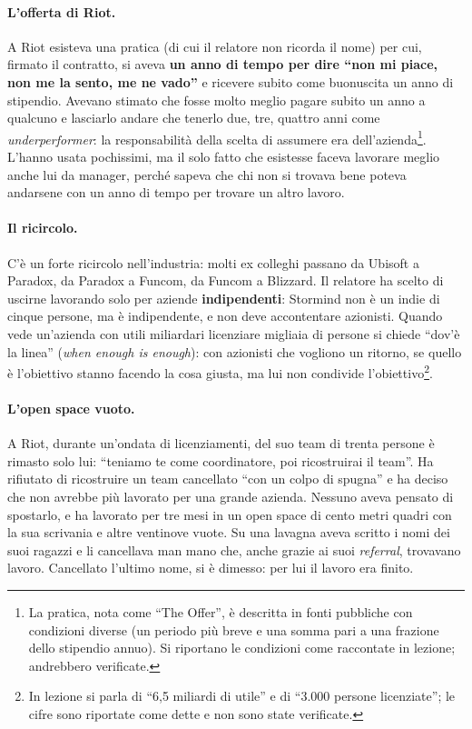 \paragraph{L'offerta di Riot.} A Riot esisteva una pratica (di cui il relatore
non ricorda il nome) per cui, firmato il contratto, si aveva \textbf{un anno
di tempo per dire ``non mi piace, non me la sento, me ne vado''} e ricevere
subito come buonuscita un anno di stipendio. Avevano stimato che fosse molto
meglio pagare subito un anno a qualcuno e lasciarlo andare che tenerlo due,
tre, quattro anni come \emph{underperformer}: la responsabilità della scelta
di assumere era dell'azienda\footnote{La pratica, nota come ``The Offer'', è
descritta in fonti pubbliche con condizioni diverse (un periodo più breve e
una somma pari a una frazione dello stipendio annuo). Si riportano le
condizioni come raccontate in lezione; andrebbero verificate.}. L'hanno usata
pochissimi, ma il solo fatto che esistesse faceva lavorare meglio anche lui da
manager, perché sapeva che chi non si trovava bene poteva andarsene con un
anno di tempo per trovare un altro lavoro.

\paragraph{Il ricircolo.} C'è un forte ricircolo nell'industria: molti ex
colleghi passano da Ubisoft a Paradox, da Paradox a Funcom, da Funcom a
Blizzard. Il relatore ha scelto di uscirne lavorando solo per aziende
\textbf{indipendenti}: Stormind non è un indie di cinque persone, ma è
indipendente, e non deve accontentare azionisti. Quando vede un'azienda con
utili miliardari licenziare migliaia di persone si chiede ``dov'è la linea''
(\emph{when enough is enough}): con azionisti che vogliono un ritorno, se
quello è l'obiettivo stanno facendo la cosa giusta, ma lui non condivide
l'obiettivo\footnote{In lezione si parla di ``6,5 miliardi di utile'' e di
``3.000 persone licenziate''; le cifre sono riportate come dette e non sono
state verificate.}.

\paragraph{L'open space vuoto.} A Riot, durante un'ondata di licenziamenti,
del suo team di trenta persone è rimasto solo lui: ``teniamo te come
coordinatore, poi ricostruirai il team''. Ha rifiutato di ricostruire un team
cancellato ``con un colpo di spugna'' e ha deciso che non avrebbe più lavorato
per una grande azienda. Nessuno aveva pensato di spostarlo, e ha lavorato per
tre mesi in un open space di cento metri quadri con la sua scrivania e altre
ventinove vuote. Su una lavagna aveva scritto i nomi dei suoi ragazzi e li
cancellava man mano che, anche grazie ai suoi \emph{referral}, trovavano
lavoro. Cancellato l'ultimo nome, si è dimesso: per lui il lavoro era finito.

